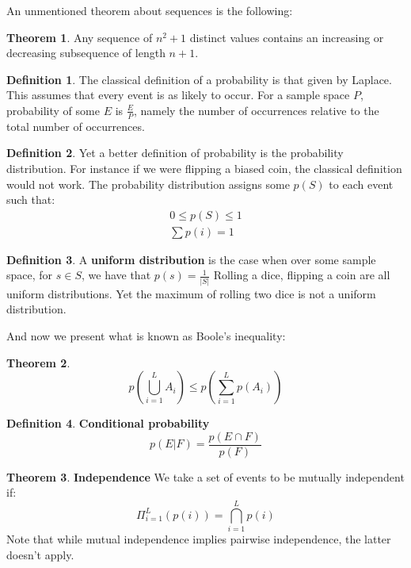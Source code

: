 \documentclass[titlepage]{article}
\theoremstyle{definition}
\newtheorem{theorem}{Theorem}[section]
\newtheorem{definition}{Definition}
\numberwithin{equation}{subsection}
\numberwithin{remark}{subsection}
\begin{document}
An unmentioned theorem about sequences is the following:

\begin{theorem}
Any sequence of $n^{2}+1$ distinct values contains an increasing or decreasing subsequence of length $n+1$.
\end{theorem}

\begin{definition}
The classical definition of a probability is that given by Laplace. This assumes that every event is as likely to occur. For a sample space $P$, probability of some $E$ is $\frac{E}{P}$, namely the number of occurrences relative to the total number of occurrences.
\end{definition}

\begin{definition}
Yet a better definition of probability is the probability distribution. For instance if we were flipping a biased coin, the classical definition would not work. The probability distribution assigns some $p(S)$ to each event such that:
\begin{align*}
    0 \leq p(S) \leq 1\\
    \sum p(i) = 1
\end{align*}
\end{definition}

\begin{definition}
A \textbf{uniform distribution} is the case when over some sample space, for $s \in S$, we have that $p(s) = \frac{1}{|S|}$ Rolling a dice, flipping a coin are all uniform distributions. Yet the maximum of rolling two dice is not a uniform distribution. 
\end{definition}

And now we present what is known as Boole's inequality:
\begin{theorem}
$$p(\bigcup_{i=1}^{L}A_{i}) \leq p(\sum_{i=1}^{L}p(A_{i}))$$
\end{theorem}

\begin{definition}\textbf{Conditional probability}
$$p(E|F) = \frac{p(E\cap F)}{p(F)}$$
\end{definition}


\begin{theorem}\textbf{Independence}
We take a set of events to be mutually independent if: $$\Pi_{i=1}^{L}(p(i)) = \bigcap_{i=1}^{L}p(i)$$
Note that while mutual independence implies pairwise independence, the latter doesn't apply. 
\end{theorem}
\end{document}
